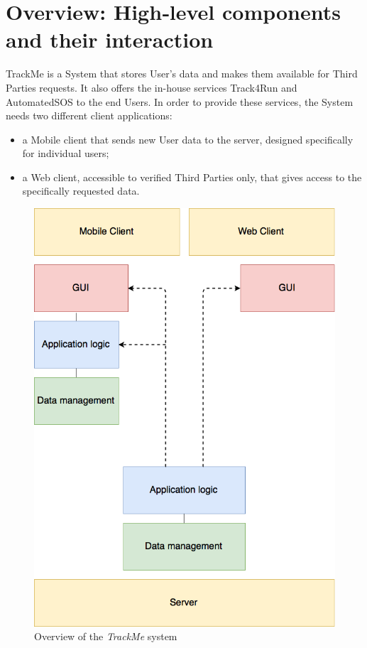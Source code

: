 \section{Overview: High‐level components and their interaction}

TrackMe is a System that stores User's data and makes them available for Third Parties requests. It also offers the in-house services Track4Run and AutomatedSOS to the end Users. In order to provide these services, the System needs two different client applications: 

\begin{itemize}[leftmargin=*]
        \item{a Mobile client that sends new User data to the server, designed specifically for individual users;}
        \item{a Web client, accessible to verified Third Parties only, that gives access to the specifically requested data.}
\end{itemize}

\begin{figure}[H]

\includegraphics[scale=0.3,keepaspectratio]{./Pictures/arch-design.png}
\centering
\caption{Overview of the \textit{TrackMe} system}

\end{figure}

